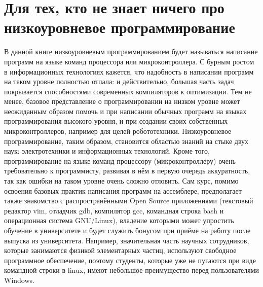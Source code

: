 \section{Для тех, кто не знает ничего про низкоуровневое программирование}
В данной книге низкоуровневым программированием будет называться
написание программ на языке команд процессора или микроконтроллера.
С бурным ростом в информационных технологиях кажется, что надобность
в написании программ на таком уровне
полностью отпала: и действительно, большая часть задач покрывается
способностями современных компиляторов к оптимизации. Тем не менее,
базовое представление о программировании на низком уровне может неожиданным
образом помочь и при написании обычных программ на языках программирования
высокого уровня, и при создании своих собственных микроконтроллеров,
например для целей робототехники. Низкоуровневое программирование, таким
образом, становится областью знаний на стыке двух наук: электротехники и
информационных технологий. Кроме того, программирование на языке команд
процессору (микроконтроллеру) очень требовательно к программисту,
развивая в нём в первую очередь аккуратность, так как ошибки на таком
уровне очень сложно отловить. Сам курс, помимо освоения базовых практик
написания программ на ассемблере, предполагает также знакомство с
распространёнными Open Source приложениями (текстовый редактор vim,
отладчик gdb, компилятор gcc, командная строка bash и операционная
система GNU/Linux), владение которыми может упростить обучение в
университете и будет служить бонусом  при приёме на работу после
выпуска из университета. Например, значительная часть
научных сотрудников, которые занимаются физикой элементарных частиц,
используют свободное программное обеспечение, поэтому студенты, которые
уже не пугаются при виде командной строки в linux, имеют небольшое
преимущество перед пользователями Windows.

